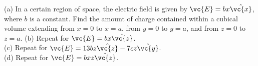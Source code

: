 (a) In a certain region of space, the electric field is given by
$\vc{E}=bx\hat{\vc{x}}$, where $b$ is a constant.
Find the amount of charge contained within a cubical volume extending
from $x=0$ to $x=a$, from $y=0$ to $y=a$, and from $z=0$ to $z=a$.\hwendpart
(b) Repeat for $\vc{E}=bx\hat{\vc{z}}$.\\
(c) Repeat for $\vc{E}=13bz\hat{\vc{z}}-7cz\hat{\vc{y}}$.\\
(d) Repeat for $\vc{E}=bxz\hat{\vc{z}}$.
